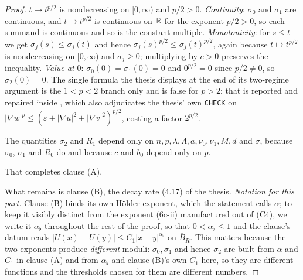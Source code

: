 \begin{proof}
$t\mapsto t^{p/2}$ is nondecreasing on $[0,\infty)$ and $p/2>0$.
\emph{Continuity}: $\sigma_0$ and $\sigma_1$ are continuous, and
$t\mapsto t^{p/2}$ is continuous on $\mathbb{R}$ for the exponent $p/2>0$, so each
summand is continuous and so is the constant multiple.
\emph{Monotonicity}: for $s\le t$ we get $\sigma_j(s)\le\sigma_j(t)$ and hence
$\sigma_j(s)^{p/2}\le\sigma_j(t)^{p/2}$, again because $t\mapsto t^{p/2}$ is
nondecreasing on $[0,\infty)$ and $\sigma_j\ge0$; multiplying by $c>0$
preserves the inequality.  \emph{Value at $0$}: $\sigma_0(0)=\sigma_1(0)=0$ and
$0^{p/2}=0$ since $p/2\ne0$, so $\sigma_2(0)=0$.  The
single formula the thesis displays at the end of its two-regime argument is the
$1<p<2$ branch only and is false for $p>2$; that is reported and repaired
inside , which also adjudicates the
thesis' own \texttt{CHECK} on
$|\nabla w|^p\le(\varepsilon+|\nabla u|^2+|\nabla v|^2)^{p/2}$, costing a
factor $2^{p/2}$.

The quantities $\sigma_2$ and $R_1$ depend only on
$n,p,\lambda,\Lambda,a,\nu_0,\nu_1,M,d$ and $\sigma$, because $\sigma_0$,
$\sigma_1$ and $R_0$ do and because $c$ and $b_0$ depend only on $p$.

That completes clause (A).

What remains is clause (B), the decay rate (4.17) of the thesis.  \emph{Notation for
this part.}  Clause (B) binds its own H\"older exponent, which the statement
calls $\alpha$; to keep it visibly distinct from the exponent (6c-ii)
manufactured out of (C4), we write it $\alpha_\flat$ throughout the rest of the
proof, so that $0<\alpha_\flat\le1$ and the clause's datum reads
$|U(x)-U(y)|\le C_1|x-y|^{\alpha_\flat}$ on $\overline B_R$.  This matters
because the two exponents produce \emph{different} moduli: $\sigma_0,\sigma_1$
and hence $\sigma_2$ are built from $\alpha$ and $C_1$ in clause (A) and from
$\alpha_\flat$ and clause (B)'s own $C_1$ here, so they are different functions
and the thresholds chosen for them are different numbers.


\end{proof}
